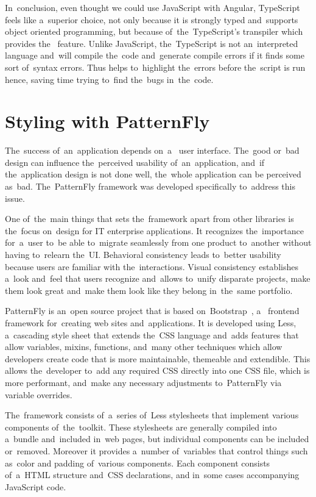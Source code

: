 In~conclusion, even thought we could use JavaScript with Angular, TypeScript
feels like a~superior choice, not only because it is strongly typed and~supports
object oriented programming, but because of~the~TypeScript's transpiler which
provides the~ feature. Unlike JavaScript,
the~TypeScript is not an~interpreted language and~will compile the~code
and~generate compile errors if it finds some sort of~syntax errors. Thus
helps to~highlight the~errors before the~script is run hence, saving time trying
to~find the~bugs in~the~code.

\section{Styling with PatternFly}
The~success of~an~application depends on~a~ user interface.
The~good or~bad design can influence the~perceived usability of~an~application,
and~if the~application design is not done well, the~whole application can be
perceived as~bad. The~PatternFly framework was developed specifically to~address
this issue.

One of~the~main things that sets the~framework apart from other libraries is
the~focus on~design for IT enterprise applications. It recognizes the~importance
for~a~user to~be able to~migrate seamlessly from one product to~another without
having to~relearn the~UI. Behavioral consistency leads to~better usability
because users are familiar with the~interactions. Visual consistency establishes
a~look and~feel that users recognize and~allows to~unify disparate projects,
make them look great and~make them look like they belong in~the~same portfolio.

PatternFly is an~open source project that is based
on~Bootstrap~\cite{Bootstrap}, a~ frontend framework
for~creating web sites and~applications. It is developed using
Less, a~cascading style sheet
 that extends the~CSS language and~adds features that allow
variables, mixins, functions, and~many other techniques which allow developers
create code that is more maintainable, themeable and extendible. This allows
the~developer to~add any required  CSS directly into one CSS
file, which is more performant, and~make any necessary adjustments to~PatternFly
via variable overrides.

The~framework consists of~a~series of~Less stylesheets that implement
various components of~the~toolkit. These stylesheets are generally compiled into
a~bundle and~included in~web pages, but individual components can be included
or~removed. Moreover it provides a~number of~variables that control things such
as~color and padding of~various components. Each component consists
of~a~HTML structure and~CSS declarations, and in~some cases
accompanying JavaScript code.

